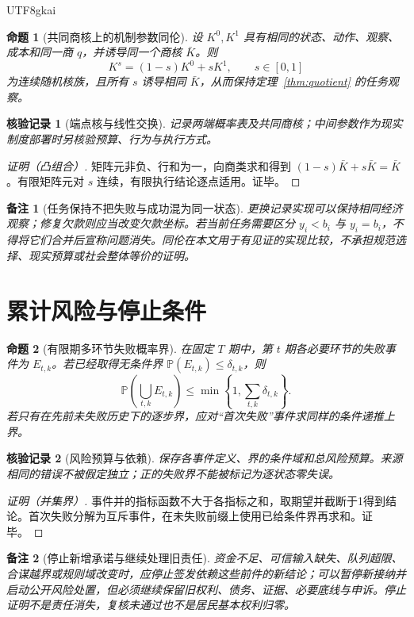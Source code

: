 \documentclass[12pt,a4paper,openany]{report}
\newtheorem{proposition}{命题}[chapter]
\newtheorem{remark}{备注}[chapter]
\newtheorem{Certificate}{核验记录}[chapter]
\newcommand{\PP}{\mathbb P}
\begin{document}
\begin{CJK*}{UTF8}{gkai}
\begin{proposition}[共同商核上的机制参数同伦]
\label{prop:homotopy}
设 $K^0,K^1$ 具有相同的状态、动作、观察、成本和同一商 $q$，并诱导同一个商核 $\bar K$。则
\[
 K^s=(1-s)K^0+sK^1,\qquad s\in[0,1]
\]
为连续随机核族，且所有 $s$ 诱导相同 $\bar K$，从而保持定理~\ref{thm:quotient} 的任务观察。
\end{proposition}
\begin{Certificate}[端点核与线性交换]
记录两端概率表及共同商核；中间参数作为现实制度部署时另核验预算、行为与执行方式。
\end{Certificate}
\begin{proof}[证明（凸组合）]
矩阵元非负、行和为一，向商类求和得到 $(1-s)\bar K+s\bar K=\bar K$。有限矩阵元对 $s$ 连续，有限执行结论逐点适用。证毕。
\end{proof}

\begin{remark}[任务保持不把失败与成功混为同一状态]
更换记录实现可以保持相同经济观察；修复欠款则应当改变欠款坐标。若当前任务需要区分 $y_i<b_i$ 与 $y_i=b_i$，不得将它们合并后宣称问题消失。同伦在本文用于有见证的实现比较，不承担规范选择、现实预算或社会整体等价的证明。
\end{remark}

\section{累计风险与停止条件}
\begin{proposition}[有限期多环节失败概率界]
\label{prop:union}
在固定 $T$ 期中，第 $t$ 期各必要环节的失败事件为 $E_{t,k}$。若已经取得无条件界 $\PP(E_{t,k})\le\delta_{t,k}$，则
\[
 \PP\left(\bigcup_{t,k}E_{t,k}\right)
 \le\min\left\{1,\sum_{t,k}\delta_{t,k}\right\}.
\]
若只有在先前未失败历史下的逐步界，应对“首次失败”事件求同样的条件递推上界。
\end{proposition}
\begin{Certificate}[风险预算与依赖]
保存各事件定义、界的条件域和总风险预算。来源相同的错误不被假定独立；正的失败界不能被标记为逐状态零失误。
\end{Certificate}
\begin{proof}[证明（并集界）]
事件并的指标函数不大于各指标之和，取期望并截断于1得到结论。首次失败分解为互斥事件，在未失败前缀上使用已给条件界再求和。证毕。
\end{proof}

\begin{remark}[停止新增承诺与继续处理旧责任]
资金不足、可信输入缺失、队列超限、合谋越界或规则域改变时，应停止签发依赖这些前件的新结论；可以暂停新接纳并启动公开风险处置，但必须继续保留旧权利、债务、证据、必要底线与申诉。停止证明不是责任消失，复核未通过也不是居民基本权利归零。
\end{remark}

\end{CJK*}
\end{document}

